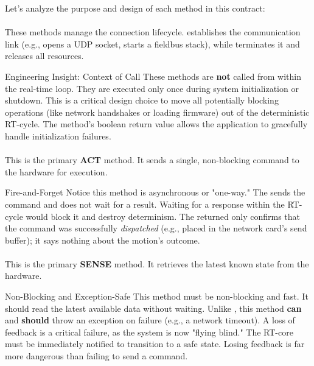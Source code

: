Let's analyze the purpose and design of each method in this contract:


\paragraph{{}}
These methods manage the connection lifecycle.  establishes the communication link (e.g., opens a UDP socket, starts a fieldbus stack), while  terminates it and releases all resources.

\begin{tipbox}{Engineering Insight: Context of Call}
These methods are \textbf{not} called from within the real-time loop. They are executed only once during system initialization or shutdown. This is a critical design choice to move all potentially blocking operations (like network handshakes or loading firmware) out of the deterministic RT-cycle. The  method's boolean return value allows the application to gracefully handle initialization failures.
\end{tipbox}

\paragraph{}
This is the primary \textbf{ACT} method. It sends a single, non-blocking command to the hardware for execution.

\begin{tipbox}{Fire-and-Forget}
Notice this method is asynchronous or "one-way." The  sends the command and does not wait for a result. Waiting for a response within the RT-cycle would block it and destroy determinism. The returned  only confirms that the command was successfully \textit{dispatched} (e.g., placed in the network card's send buffer); it says nothing about the motion's outcome.
\end{tipbox}


\paragraph{}
This is the primary \textbf{SENSE} method. It retrieves the latest known state from the hardware.

\begin{tipbox}{Non-Blocking and Exception-Safe}
This method must be non-blocking and fast. It should read the latest available data without waiting. Unlike , this method \textbf{can} and \textbf{should} throw an exception on failure (e.g., a network timeout). A loss of feedback is a critical failure, as the system is now "flying blind." The RT-core must be immediately notified to transition to a safe state. Losing feedback is far more dangerous than failing to send a command.
\end{tipbox}

